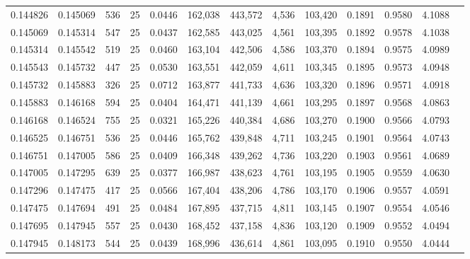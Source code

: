\begin{tabular}{rrrrrrrrrrrrr}
0.144826 & 0.145069 &   536 &  25 &                                     0.0446 & 162,038 & 443,572 &   4,536 & 103,420 & 0.1891 & 0.9580 & 4.1088 \\
0.145069 & 0.145314 &   547 &  25 &                                     0.0437 & 162,585 & 443,025 &   4,561 & 103,395 & 0.1892 & 0.9578 & 4.1038 \\
0.145314 & 0.145542 &   519 &  25 &                                     0.0460 & 163,104 & 442,506 &   4,586 & 103,370 & 0.1894 & 0.9575 & 4.0989 \\
0.145543 & 0.145732 &   447 &  25 &                                     0.0530 & 163,551 & 442,059 &   4,611 & 103,345 & 0.1895 & 0.9573 & 4.0948 \\
0.145732 & 0.145883 &   326 &  25 &                                     0.0712 & 163,877 & 441,733 &   4,636 & 103,320 & 0.1896 & 0.9571 & 4.0918 \\
0.145883 & 0.146168 &   594 &  25 &                                     0.0404 & 164,471 & 441,139 &   4,661 & 103,295 & 0.1897 & 0.9568 & 4.0863 \\
0.146168 & 0.146524 &   755 &  25 &                                     0.0321 & 165,226 & 440,384 &   4,686 & 103,270 & 0.1900 & 0.9566 & 4.0793 \\
0.146525 & 0.146751 &   536 &  25 &                                     0.0446 & 165,762 & 439,848 &   4,711 & 103,245 & 0.1901 & 0.9564 & 4.0743 \\
0.146751 & 0.147005 &   586 &  25 &                                     0.0409 & 166,348 & 439,262 &   4,736 & 103,220 & 0.1903 & 0.9561 & 4.0689 \\
0.147005 & 0.147295 &   639 &  25 &                                     0.0377 & 166,987 & 438,623 &   4,761 & 103,195 & 0.1905 & 0.9559 & 4.0630 \\
0.147296 & 0.147475 &   417 &  25 &                                     0.0566 & 167,404 & 438,206 &   4,786 & 103,170 & 0.1906 & 0.9557 & 4.0591 \\
0.147475 & 0.147694 &   491 &  25 &                                     0.0484 & 167,895 & 437,715 &   4,811 & 103,145 & 0.1907 & 0.9554 & 4.0546 \\
0.147695 & 0.147945 &   557 &  25 &                                     0.0430 & 168,452 & 437,158 &   4,836 & 103,120 & 0.1909 & 0.9552 & 4.0494 \\
0.147945 & 0.148173 &   544 &  25 &                                     0.0439 & 168,996 & 436,614 &   4,861 & 103,095 & 0.1910 & 0.9550 & 4.0444 \\

\end{tabular}
